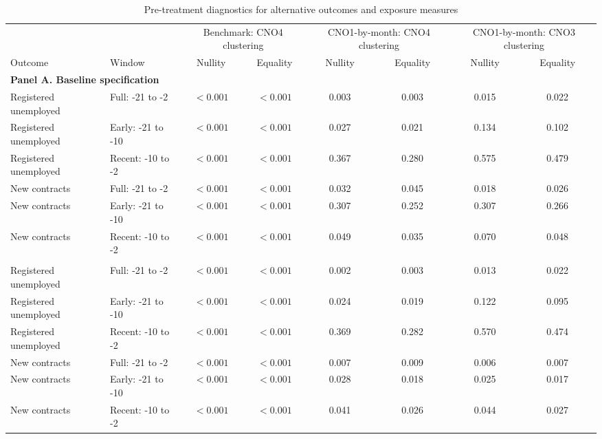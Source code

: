 \begin{landscape}
\begin{table}[H]
\centering
\caption{Pre-treatment diagnostics for alternative outcomes and exposure measures}
\label{tab:v1_robustness_pretrends}
\begin{threeparttable}
\scriptsize
\renewcommand{\arraystretch}{0.88}
\setlength{\tabcolsep}{3.0pt}
\begin{tabular}{@{}llcccccc@{}}
\toprule
& & \multicolumn{2}{c}{Benchmark: CNO4 clustering} & \multicolumn{2}{c}{CNO1-by-month: CNO4 clustering} & \multicolumn{2}{c}{CNO1-by-month: CNO3 clustering} \\
\cmidrule(lr){3-4}\cmidrule(lr){5-6}\cmidrule(lr){7-8}
Outcome & Window & Nullity & Equality & Nullity & Equality & Nullity & Equality \\
\midrule
\multicolumn{8}{l}{\textbf{Panel A. Baseline specification}} \\
Registered unemployed & Full: -21 to -2 & $<0.001$ & $<0.001$ & 0.003 & 0.003 & 0.015 & 0.022 \\
Registered unemployed & Early: -21 to -10 & $<0.001$ & $<0.001$ & 0.027 & 0.021 & 0.134 & 0.102 \\
Registered unemployed & Recent: -10 to -2 & $<0.001$ & $<0.001$ & 0.367 & 0.280 & 0.575 & 0.479 \\
New contracts & Full: -21 to -2 & $<0.001$ & $<0.001$ & 0.032 & 0.045 & 0.018 & 0.026 \\
New contracts & Early: -21 to -10 & $<0.001$ & $<0.001$ & 0.307 & 0.252 & 0.307 & 0.266 \\
New contracts & Recent: -10 to -2 & $<0.001$ & $<0.001$ & 0.049 & 0.035 & 0.070 & 0.048 \\
\addlinespace
\multicolumn{8}{l}{\textbf{Panel B. Alternative outcomes: log(Y+1)}} \\
Registered unemployed & Full: -21 to -2 & $<0.001$ & $<0.001$ & 0.002 & 0.003 & 0.013 & 0.022 \\
Registered unemployed & Early: -21 to -10 & $<0.001$ & $<0.001$ & 0.024 & 0.019 & 0.122 & 0.095 \\
Registered unemployed & Recent: -10 to -2 & $<0.001$ & $<0.001$ & 0.369 & 0.282 & 0.570 & 0.474 \\
New contracts & Full: -21 to -2 & $<0.001$ & $<0.001$ & 0.007 & 0.009 & 0.006 & 0.007 \\
New contracts & Early: -21 to -10 & $<0.001$ & $<0.001$ & 0.028 & 0.018 & 0.025 & 0.017 \\
New contracts & Recent: -10 to -2 & $<0.001$ & $<0.001$ & 0.041 & 0.026 & 0.044 & 0.027 \\

\end{tabular}
\end{threeparttable}
\end{table}
\end{landscape}
